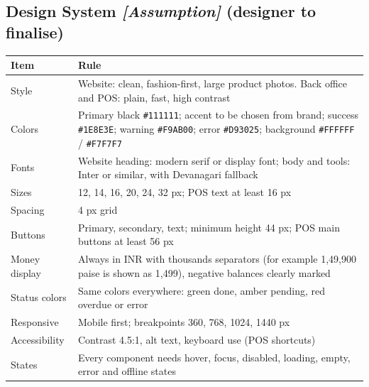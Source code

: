 \documentclass[11pt,a4paper]{article}
\newcommand{\assump}{\textit{[Assumption]}}
\newcommand{\hdr}{\rowcolor{hdrgray}\bfseries}
\begin{document}
\subsection{Design System \assump{} (designer to finalise)}
\begin{longtable}{L{3cm}L{13.5cm}}
\hdr Item & Rule \\ \endhead
Style & Website: clean, fashion-first, large product photos. Back office and POS: plain, fast, high contrast \\
Colors & Primary black \texttt{\#111111}; accent to be chosen from brand; success \texttt{\#1E8E3E}; warning \texttt{\#F9AB00}; error \texttt{\#D93025}; background \texttt{\#FFFFFF} / \texttt{\#F7F7F7} \\
Fonts & Website heading: modern serif or display font; body and tools: Inter or similar, with Devanagari fallback \\
Sizes & 12, 14, 16, 20, 24, 32 px; POS text at least 16 px \\
Spacing & 4 px grid \\
Buttons & Primary, secondary, text; minimum height 44 px; POS main buttons at least 56 px \\
Money display & Always in INR with thousands separators (for example 1,49,900 paise is shown as 1,499), negative balances clearly marked \\
Status colors & Same colors everywhere: green done, amber pending, red overdue or error \\
Responsive & Mobile first; breakpoints 360, 768, 1024, 1440 px \\
Accessibility & Contrast 4.5:1, alt text, keyboard use (POS shortcuts) \\
States & Every component needs hover, focus, disabled, loading, empty, error and offline states \\
\end{longtable}
\end{document}
